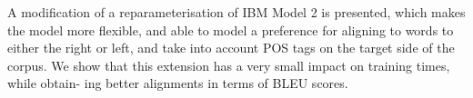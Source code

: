 A modification of a reparameterisation of IBM Model 2 is presented, which makes the model more flexible, and able to model a preference for aligning to words to either the right or left, and take into account POS tags on the target side of the corpus. We show that this extension has a very small impact on training times, while obtain- ing better alignments in terms of BLEU scores.
